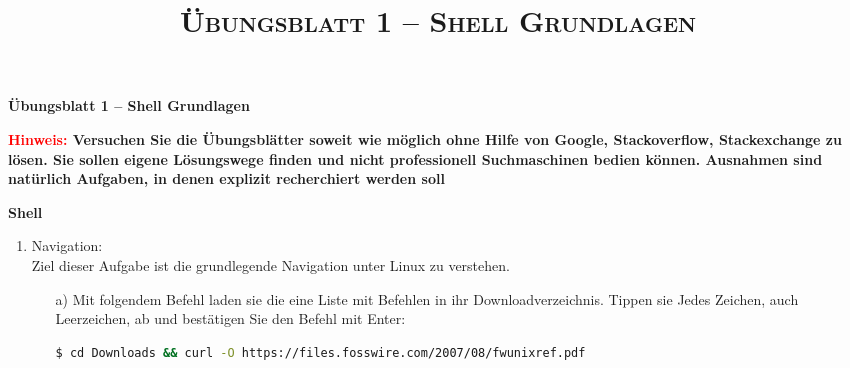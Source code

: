 \documentclass[paper=a4,fontsize=11pt]{scrartcl}%
\title{	
\normalfont \normalsize 
\textsc{Übungsblatt 1 -- Shell Grundlagen}
}
\numberwithin{equation}{section}
\begin{document}
\center
\Large{\textbf{Übungsblatt 1 -- Shell Grundlagen}}\\
\large{\textbf{\textcolor{red}{Hinweis:} Versuchen Sie die Übungsblätter soweit wie möglich ohne Hilfe von Google, Stackoverflow, Stackexchange zu lösen. Sie sollen eigene Lösungswege finden und nicht professionell Suchmaschinen bedien können. Ausnahmen sind natürlich Aufgaben, in denen explizit recherchiert werden soll}
\begin{center}\Large{\textbf{Shell}}\end{center}\vskip0.25in
\begin{enumerate}
\item Navigation:\\
Ziel dieser Aufgabe ist die grundlegende Navigation unter Linux zu verstehen.\\
  
	\begin{itemize}
		\item[a)] Mit folgendem Befehl laden sie die eine Liste mit Befehlen in ihr Downloadverzeichnis. Tippen sie Jedes Zeichen, auch Leerzeichen, ab und bestätigen Sie den Befehl mit Enter:\\
		\begin{lstlisting}[style=Bash, language=Bash]
$ cd Downloads && curl -O https://files.fosswire.com/2007/08/fwunixref.pdf
		\end{lstlisting}


\end{itemize}
\end{enumerate}}
\end{document}
